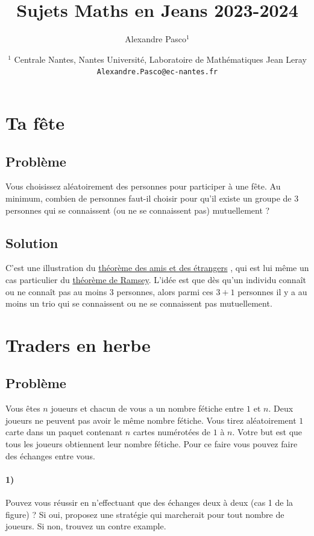 \documentclass[a4paper,10pt,oneside]{article}
\title{Sujets Maths en Jeans 2023-2024}
\author{
  Alexandre Pasco${}^{1}$}
\date{\medskip%
  \small %
  ${}^1$  Centrale Nantes, Nantes Université, Laboratoire de Mathématiques Jean Leray\\
  \texttt{Alexandre.Pasco@ec-nantes.fr}
  }
\begin{document}
\maketitle


\section{Ta fête}

\subsection{Problème}

Vous choisissez aléatoirement des personnes pour participer à une fête. 
Au minimum, combien de personnes faut-il choisir pour qu'il existe un groupe de $3$ personnes qui se connaissent (ou ne se connaissent pas) mutuellement ? 


\subsection{Solution}

C'est une illustration du 
\href{
  https://fr.wikipedia.org/wiki/Th%
}{théorème des amis et des étrangers}
, qui est lui même un cas particulier du
\href{
  https://fr.wikipedia.org/wiki/Th%
}{théorème de Ramsey}.
L'idée est que dès qu'un individu connaît ou ne connaît pas au moins $3$ personnes, alors parmi ces $3+1$ personnes il y a au moins un trio qui se connaissent ou ne se connaissent pas mutuellement.

\section{Traders en herbe}

\subsection{Problème}

Vous êtes $n$ joueurs et chacun de vous a un nombre fétiche entre $1$ et $n$. 
Deux joueurs ne peuvent pas avoir le même nombre fétiche.
Vous tirez aléatoirement $1$ carte dans un paquet contenant $n$ cartes numérotées de $1$ à $n$. Votre but est que tous les joueurs obtiennent leur nombre fétiche.
Pour ce faire vous pouvez faire des échanges entre vous.

\paragraph*{1)} 
Pouvez vous réussir en n'effectuant que des échanges deux à deux (cas 1 de la figure) ? 
Si oui, proposez une stratégie qui marcherait pour tout nombre de joueurs.
Si non, trouvez un contre example.
\end{document}

